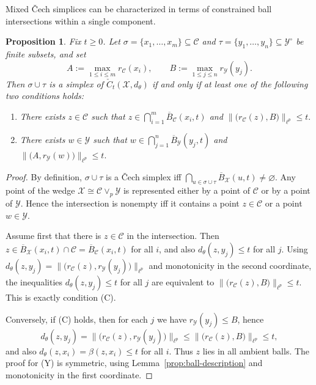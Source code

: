 \documentclass[11pt]{amsart}
\newtheorem{proposition}[theorem]{Proposition}
\theoremstyle{definition}
\theoremstyle{remark}
\newcommand{\1}{\mathbbm{1}}
\begin{document}
Mixed \v{C}ech simplices can be characterized in terms of constrained ball intersections within a single component.

\begin{proposition}
\label{prop:cech-mixed-criterion}
Fix $t\ge 0$.
Let $\sigma=\{x_1,\dots,x_m\}\subseteq\mathcal C$ and $\tau=\{y_1,\dots,y_n\}\subseteq\mathcal Y^\circ$
be finite subsets, and set \[A:=\max_{1\le i\le m} r_{\mathcal C}(x_i),\qquad
B:=\max_{1\le j\le n} r_{\mathcal Y}(y_j).\]
Then $\sigma\cup\tau$ is a simplex of $\check{C}_t(\mathcal X,d_\theta)$ if and only if at least one of the
following two conditions holds:

\begin{enumerate}
\item[(C)] There exists $z\in\mathcal C$ such that
$z\in \bigcap_{i=1}^m \overline{B}_{\mathcal C}(x_i,t)$ and 
$\bigl\|\bigl(r_{\mathcal C}(z),B\bigr)\bigr\|_{\ell^p}\le t.$

\item[(Y)] There exists $w\in\mathcal Y$ such that $w\in \bigcap_{j=1}^n \overline{B}_{\mathcal Y}(y_j,t)$ and 
$\bigl\|\bigl(A,r_{\mathcal Y}(w)\bigr)\bigr\|_{\ell^p}\le t.$
\end{enumerate}
\end{proposition}

\begin{proof}
By definition, $\sigma\cup\tau$ is a \v{C}ech simplex iff $\bigcap_{u\in \sigma\cup\tau}\overline{B}_{\mathcal X}(u,t)\neq\varnothing.$ Any point of the wedge $\mathcal X\cong \mathcal C\vee_p\mathcal Y$ is represented either by a point of
$\mathcal C$ or by a point of $\mathcal Y$.
Hence the intersection is nonempty iff it contains a point $z\in\mathcal C$ or a point $w\in\mathcal Y$.

Assume first that there is $z\in\mathcal C$ in the intersection.
Then $z\in\overline{B}_{\mathcal X}(x_i,t)\cap\mathcal C=\overline{B}_{\mathcal C}(x_i,t)$ for all $i$,
and also $d_\theta(z,y_j)\le t$ for all $j$.
Using $d_\theta(z,y_j)=\bigl\|\bigl(r_{\mathcal C}(z),r_{\mathcal Y}(y_j)\bigr)\bigr\|_{\ell^p}$ and monotonicity in the second coordinate, the inequalities $d_\theta(z,y_j)\le t$ for all $j$
are equivalent to $\bigl\|\bigl(r_{\mathcal C}(z),B\bigr)\bigr\|_{\ell^p}\le t.$ This is exactly condition \textup{(C)}.

Conversely, if \textup{(C)} holds, then for each $j$ we have $r_{\mathcal Y}(y_j)\le B$, hence
\[
d_\theta(z,y_j)
=
\bigl\|\bigl(r_{\mathcal C}(z),r_{\mathcal Y}(y_j)\bigr)\bigr\|_{\ell^p}
\le
\bigl\|\bigl(r_{\mathcal C}(z),B\bigr)\bigr\|_{\ell^p}
\le t,
\]
and also $d_\theta(z,x_i)=\beta(z,x_i)\le t$ for all $i$.
Thus $z$ lies in all ambient balls.
The proof for \textup{(Y)} is symmetric, using Lemma~\ref{prop:ball-description} and monotonicity
in the first coordinate.
\end{proof}
\end{document}
